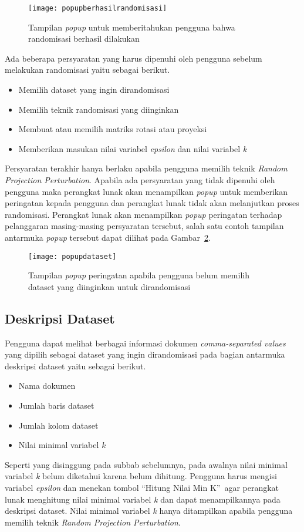 \begin{figure}
	\centering
	\texttt{[image: popupberhasilrandomisasi]}
	\caption{Tampilan \textit{popup} untuk memberitahukan pengguna bahwa randomisasi berhasil dilakukan}
	\label{fig:popupberhasilrandomisasi}
\end{figure}

Ada beberapa persyaratan yang harus dipenuhi oleh pengguna sebelum melakukan randomisasi yaitu sebagai berikut.
\begin{itemize}
	\item Memilih dataset yang ingin dirandomisasi
	\item Memilih teknik randomisasi yang diinginkan
	\item Membuat atau memilih matriks rotasi atau proyeksi
	\item Memberikan masukan nilai variabel \textit{epsilon} dan nilai variabel \textit{k}
\end{itemize}
Persyaratan terakhir hanya berlaku apabila pengguna memilih teknik \textit{Random Projection Perturbation}. Apabila ada persyaratan yang tidak dipenuhi oleh pengguna maka perangkat lunak akan menampilkan \textit{popup} untuk memberikan peringatan kepada pengguna dan perangkat lunak tidak akan melanjutkan proses randomisasi. Perangkat lunak akan menampilkan \textit{popup} peringatan terhadap pelanggaran masing-masing persyaratan tersebut, salah satu contoh tampilan antarmuka \textit{popup} tersebut dapat dilihat pada Gambar~\ref{fig:popupdataset}.

\begin{figure}
	\centering
	\texttt{[image: popupdataset]}
	\caption{Tampilan \textit{popup} peringatan apabila pengguna belum memilih dataset yang diinginkan untuk dirandomisasi}
	\label{fig:popupdataset}
\end{figure}

\subsection{Deskripsi Dataset}
\label{subsec:deskripsidataset}

Pengguna dapat melihat berbagai informasi dokumen \textit{comma-separated values} yang dipilih sebagai dataset yang ingin dirandomisasi pada bagian antarmuka deskripsi dataset yaitu sebagai berikut. 
\begin{itemize}
	\item Nama dokumen
	\item Jumlah baris dataset
	\item Jumlah kolom dataset
	\item Nilai minimal variabel \textit{k}
\end{itemize}
Seperti yang disinggung pada subbab sebelumnya, pada awalnya nilai minimal variabel \textit{k} belum diketahui karena belum dihitung. Pengguna harus mengisi variabel \textit{epsilon} dan menekan tombol \textquotedblleft Hitung Nilai Min K\textquotedblright~agar perangkat lunak menghitung nilai minimal variabel \textit{k} dan dapat menampilkannya pada deskripsi dataset. Nilai minimal variabel \textit{k} hanya ditampilkan apabila pengguna memilih teknik \textit{Random Projection Perturbation}.

